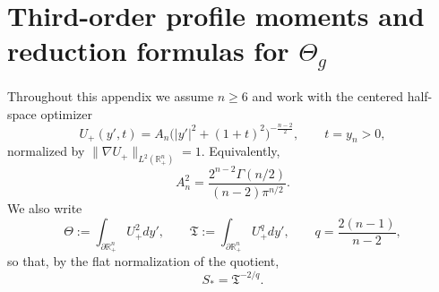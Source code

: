 \documentclass[11pt,reqno,a4paper]{amsart}
\newcommand{\R}{\mathbb{R}}
\numberwithin{equation}{section}
\theoremstyle{plain}
\theoremstyle{remark}
\theoremstyle{plain}
\begin{document}
\section{Third-order profile moments and reduction formulas for \texorpdfstring{$\Theta_g$}{Theta\_g}}\label{app:Theta-moments}

Throughout this appendix we assume $n\ge 6$ and work with the centered half-space optimizer
\[
U_+(y',t)=A_n\big(|y'|^2+(1+t)^2\big)^{-\frac{n-2}{2}},\qquad t=y_n>0,
\]
normalized by $\|\nabla U_+\|_{L^2(\R^n_+)}=1$. Equivalently,
\[
A_n^2=\frac{2^{n-2}\Gamma(n/2)}{(n-2)\pi^{n/2}}.
\]
We also write
\[
\Theta:=\int_{\partial\R^n_+}U_+^2dy',
\qquad
\mathfrak T:=\int_{\partial\R^n_+}U_+^{q}dy',
\qquad q=\frac{2(n-1)}{n-2},
\]
so that, by the flat normalization of the quotient,
\[
S_*=\mathfrak T^{-2/q}.
\]
\end{document}
